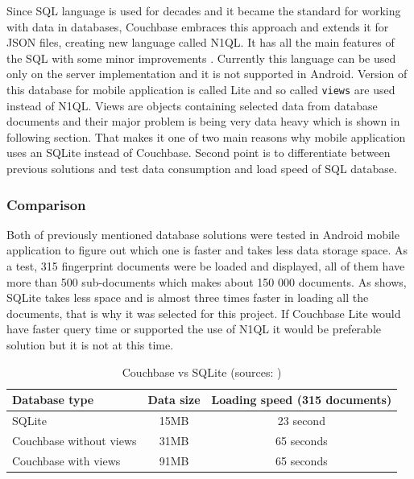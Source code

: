 Since SQL language is used for decades and it became the standard for working with data in databases, Couchbase embraces this approach and extends it for JSON files, creating new language called N1QL. It has all the main features of the SQL with some minor improvements \cite{WINQL}. Currently this language can be used only on the server implementation and it is not supported in Android. Version of this database for mobile application is called Lite and so called \verb|views| are used instead of N1QL. Views are objects containing selected data from database documents and their major problem is being very data heavy which is shown in following section. That makes it one of two main reasons why mobile application uses an SQLite instead of Couchbase. Second point is to differentiate between previous solutions and test data consumption and load speed of SQL database.

\subsubsection{Comparison}\label{subsubsec:Comparison}
Both of previously mentioned database solutions were tested in Android mobile application to figure out which one is faster and takes less data storage space. As a test, 315 fingerprint documents were be loaded and displayed, all of them have more than 500 sub-documents which makes about 150 000 documents. As  shows, SQLite takes less space and is almost three times faster in loading all the documents, that is why it was selected for this project. If Couchbase Lite would have faster query time or supported the use of N1QL it would be preferable solution but it is not at this time.

\begin{table}[h]
	\begin{center}
		\begin{tabular}{| l | c | c |}
			\hline
			Database type & Data size & Loading speed (315 documents) \\ \hline
			SQLite & 15MB & 23 second \\ \hline
			Couchbase without views & 31MB & 65 seconds \\ \hline
			Couchbase with views & 91MB & 65 seconds \\ \hline
		\end{tabular}
		\caption{Couchbase vs SQLite (sources: \cite{LGWSP, LGWST, HW2, PM600, AZW3})}
		\label{tab3}
	\end{center}
\end{table}

